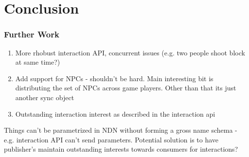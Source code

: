 \chapter{Conclusion}

\subsection{Further Work}
\begin{enumerate}
    \item More rhobust interaction API, concurrent issues (e.g. two people shoot block at same time?)
    \item Add support for NPCs - shouldn't be hard. Main interesting bit is distributing the set of NPCs across game players. Other than that its just another sync object
    \item Outstanding interaction interest as described in the interaction api 
\end{enumerate}


Things can't be parametrized in NDN without forming a gross name schema - e.g. interaction API can't send parameters. Potential solution is to have publisher's maintain outstanding interests towards consumers for interactions?
